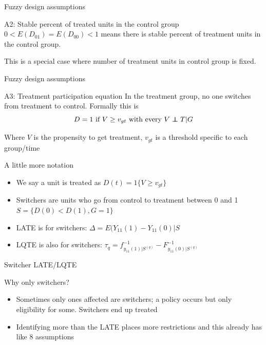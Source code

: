 \documentclass{beamer}
\newcommand\independent{\protect\mathpalette{\protect\independenT}{\perp}}
\def\independenT#1#2{\mathrel{\rlap{$#1#2$}\mkern2mu{#1#2}}}
\begin{document}
\begin{frame}{Fuzzy design assumptions}

\begin{block}{A2: Stable percent of treated units in the control group}
$0<E(D_{01} ) = E(D_{00})<1$ means there is stable percent of treatment units in the control group.
\end{block}This is a special case where number of treatment units in control group is fixed. 

\end{frame}

\begin{frame}{Fuzzy design assumptions}

\begin{block}{A3: Treatment participation equation}
In the treatment group, no one switches from treatment to control. Formally this is $$D=1\text{ if } V \geq v_{gt}\text{ with every } V \independent T|G$$
\end{block}Where $V$ is the propensity to get treatment, $v_{gt}$ is a threshold specific to each group/time


\end{frame}

\begin{frame}{A little more notation}

\begin{itemize}
\item We say a unit is treated as $D(t) = 1 \{V \geq v_{gt} \}$
\item Switchers are units who go from control to treatment between 0 and 1 $S= \{ D(0) <D(1), G=1 \}$
\item LATE is for switchers: $\Delta=E(Y_{11}(1) - Y_{11}(0) | S$
\item LQTE is also for switchers: $\tau_q = f^{-1}_{y_{11}(1)|S^(q)} - F^{-1}_{y_{11}(0)|S^(q)}$

\end{itemize}

\end{frame}

\begin{frame}{Switcher LATE/LQTE}

Why only switchers?


\begin{itemize}
\item Sometimes only ones affected are switchers; a policy occurs but only eligibility for some.  Switchers end up treated
\item Identifying more than the LATE places more restrictions and this already has like 8 assumptions
\end{itemize}

\end{frame}
\end{document}
